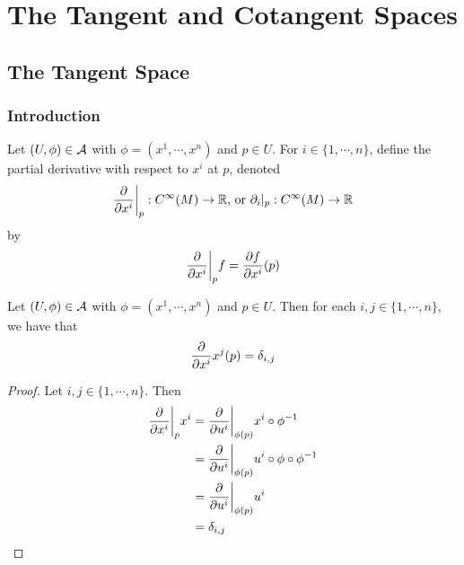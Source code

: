 \documentclass{book}
\begin{document}
	\newpage
	\chapter{The Tangent and Cotangent Spaces}
	\section{The Tangent Space}



	\subsection{Introduction}

	\begin{defn}
		Let $(U, \phi) \in \mathcal{A}$ with $\phi = (x^1, \cdots, x^n)$ and $p \in U$. For $i \in \{1, \cdots, n\}$, define the partial derivative with respect to $x^i$ at $p$, denoted $$\frac{\partial}{\partial x^i} \bigg|_p: C^{\infty}(M) \rightarrow \mathbb{R}  \text{, or } \partial_i|_p: C^{\infty}(M) \rightarrow \mathbb{R} $$ by $$ \frac{\partial}{\partial x^i} \bigg |_p  f =  \frac{\partial f}{\partial x^i}(p) $$
	\end{defn}

	\begin{ex}
		Let $(U, \phi) \in \mathcal{A}$ with $\phi = (x^1, \cdots, x^n)$ and $p \in U$. Then for each $i,j \in \{1, \cdots, n\}$, we have that $${\frac{\partial}{\partial x^i}{x^j}}(p) = \delta_{i,j}$$
	\end{ex}

	\begin{proof}
		Let $i,j \in \{1, \cdots, n\}$. Then 
		\begin{align*}
			\frac{\partial}{\partial x^i} \bigg|_p x^i 
			&=  \frac{\partial}{\partial u^i} \bigg|_{\phi(p)} x^i \circ \phi^{-1} \\
			&= \frac{\partial}{\partial u^i} \bigg|_{\phi(p)} u^i \circ \phi \circ \phi^{-1} \\
			&= \frac{\partial}{\partial u^i} \bigg|_{\phi(p)} u^i  \\
			&= \delta_{i,j}
		\end{align*}
	\end{proof}
\end{document}
